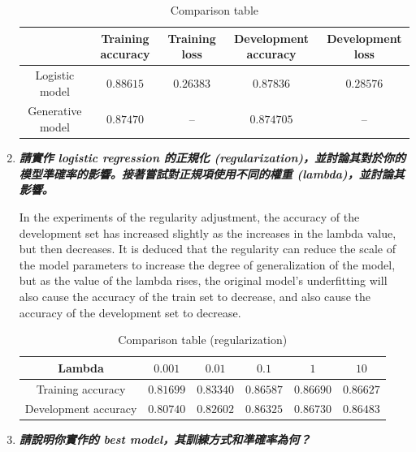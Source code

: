 \documentclass[a4paper,11pt]{article}
\begin{document}
\begin{enumerate}
	\begin{table}[htp]
		\begin{center}
			\begin{tabular}{ | c | c | c | c | c |}
			  	\hline
		  		& Training accuracy & Training loss & Development accuracy & Development loss\\[0.5ex] 
		  		\hline \hline
		  		Logistic model & $0.88615$ & $0.26383$ & $0.87836$ & $0.28576$\\[0.2ex]
		  		\hline
		  		Generative model & $0.87470$ & -- & $0.874705$ & -- \\[0.2ex]
		  		\hline
			\end{tabular}
			\caption{Comparison table}
		\end{center}
	\end{table}

	\item \textit{\textbf{請實作 logistic regression 的正規化 (regularization)，並討論其對於你的模型準確率的影響。接著嘗試對正規項使用不同的權重 (lambda)，並討論其影響。}}

	In the experiments of the regularity adjustment, the accuracy of the development set has increased slightly as the increases in the lambda value, but then decreases. It is deduced that the regularity can reduce the scale of the model parameters to increase the degree of generalization of the model, but as the value of the lambda rises, the original model's underfitting will also cause the accuracy of the train set to decrease, and also cause the accuracy of the development set to decrease.\\


	\begin{table}[htp]
		\begin{center}
			\begin{tabular}{ | c | c | c | c | c | c |}
			  	\hline
		  		Lambda & $0.001$ & $0.01$ & $0.1$ & $1$ & $10$\\[0.5ex] 
		  		\hline \hline
		  		Training accuracy & $0.81699$ & $0.83340$ & $0.86587$ & $0.86690$ & $0.86627$\\[0.2ex]
		  		\hline
		  		Development accuracy & $0.80740$ & $0.82602$ & $0.86325$ & $0.86730$ & $0.86483$\\[0.2ex]
		  		\hline
			\end{tabular}
			\caption{Comparison table (regularization)}
		\end{center}
	\end{table}

	\item \textit{\textbf{請說明你實作的 best model，其訓練方式和準確率為何？}}


\end{enumerate}
\end{document}
